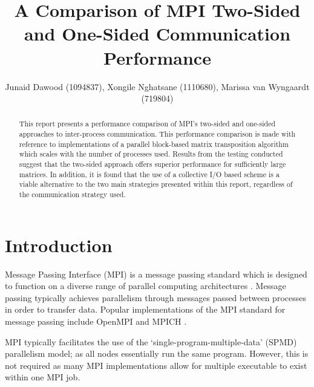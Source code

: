 \documentclass[journal,10pt,a4paper]{IEEEtran}
\begin{document}
%
\title{A Comparison of MPI Two-Sided and One-Sided Communication Performance}

\author{Junaid Dawood (1094837), Xongile Nghatsane (1110680), Marissa van Wyngaardt (719804)}%



\maketitle


\begin{abstract}
This report presents a performance comparison of MPI's two-sided and one-sided approaches to inter-process communication. This performance comparison is made with reference to implementations of a parallel block-based matrix transposition algorithm which scales with the number of processes used. Results from the testing conducted suggest that the two-sided approach offers superior performance for sufficiently large matrices. In addition, it is found that the use of a collective I/O based scheme is a viable alternative to the two main strategies presented within this report, regardless of the communication strategy used.

\end{abstract}

\IEEEpeerreviewmaketitle

\section{Introduction}
Message Passing Interface (MPI) is a message passing standard which is designed to function on a diverse range of parallel computing architectures \cite{MPIAMess20:online}. Message passing typically achieves parallelism through messages passed between processes in order to transfer data. Popular implementations of the MPI standard for message passing include OpenMPI and MPICH \cite{ompi,mpich}.

MPI typically facilitates the use of the `single-program-multiple-data' (SPMD) parallelism model; as all nodes essentially run the same program. However, this is not required as many MPI implementations allow for multiple executable to exist within one MPI job. 
\end{document}
